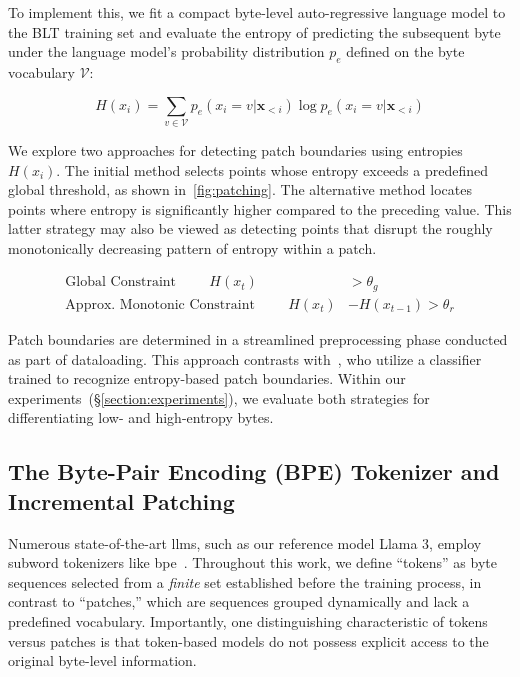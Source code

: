 To implement this, we fit a compact byte-level auto-regressive language model to the {\textsc BLT} training set and evaluate the entropy of predicting the subsequent byte under the language model’s probability distribution $p_{e}$ defined on the byte vocabulary $\mathcal{V}$:

\begin{equation}
H(x_i) = \sum_{v \in \mathcal{V}} p_{e}(x_i=v|\pmb{x}_{<i}) \log p_{e}(x_i=v|\pmb{x}_{<i})
\end{equation}

We explore two approaches for detecting patch boundaries using entropies $H(x_i)$. The initial method selects points whose entropy exceeds a predefined global threshold, as shown in~\autoref{fig:patching}. The alternative method locates points where entropy is significantly higher compared to the preceding value. This latter strategy may also be viewed as detecting points that disrupt the roughly monotonically decreasing pattern of entropy within a patch.

\begin{align*}
    \text{Global Constraint}\hspace{1cm}H(x_t)& > \theta_g\\
    \text{Approx. Monotonic Constraint}\hspace{1cm}H(x_t)& - H(x_{t-1}) > \theta_r
\end{align*}

Patch boundaries are determined in a streamlined preprocessing phase conducted as part of dataloading. This approach contrasts with~\citet{nawrot-etal-2023-efficient}, who utilize a classifier trained to recognize entropy-based patch boundaries. Within our experiments~(\S\ref{section:experiments}), we evaluate both strategies for differentiating low- and high-entropy bytes.

\subsection{The Byte-Pair Encoding (BPE) Tokenizer and Incremental Patching}
\label{section:incremental-patching}
\label{section:bpe-patch}

Numerous state-of-the-art llms, such as our reference model Llama 3, employ subword tokenizers like bpe~\citep{gage1994new, sennrich-etal-2016-neural}. Throughout this work, we define ``tokens'' as byte sequences selected from a \textit{finite} set established before the training process, in contrast to ``patches,'' which are sequences grouped dynamically and lack a predefined vocabulary. Importantly, one distinguishing characteristic of tokens versus patches is that token-based models do not possess explicit access to the original byte-level information.

